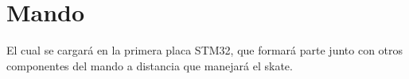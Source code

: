 \chapter{Mando}
\hypertarget{md__r_e_a_d_m_e}{}\label{md__r_e_a_d_m_e}
\label{md__r_e_a_d_m_e_autotoc_md0}%
%
 El cual se cargará en la primera placa STM32, que formará parte junto con otros componentes del mando a distancia que manejará el skate. 